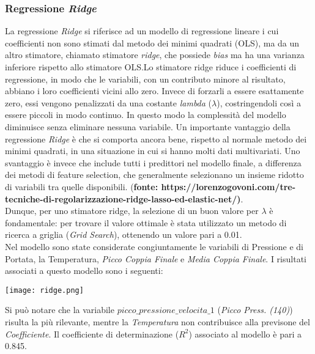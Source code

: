 \documentclass[fleqn,10pt]{SelfArx} %
\begin{document}
\subsubsection{Regressione \textit{Ridge}}
La regressione \textit{Ridge} si riferisce ad un modello di regressione lineare i cui coefficienti non sono stimati dal metodo dei minimi quadrati (OLS), ma da un altro stimatore, chiamato stimatore \textit{ridge}, che possiede \textit{bias} ma ha una varianza inferiore rispetto allo stimatore OLS.Lo stimatore ridge riduce i coefficienti di regressione, in modo che le variabili, con un contributo minore al risultato, abbiano i loro coefficienti vicini allo zero. Invece di forzarli a essere esattamente zero, essi vengono penalizzati da una costante \textit{lambda} ($\lambda$), costringendoli così a essere piccoli in modo continuo. In questo modo la complessità del modello diminuisce senza eliminare nessuna variabile. Un importante vantaggio della regressione \textit{Ridge} è che si comporta ancora bene, rispetto al normale metodo dei minimi quadrati, in una situazione in cui si hanno molti dati multivariati. Uno svantaggio è invece che include tutti i predittori nel modello finale, a differenza dei metodi di feature selection, che generalmente selezionano un insieme ridotto di variabili tra quelle disponibili. (\textbf{fonte: https://lorenzogovoni.com/tre-tecniche-di-regolarizzazione-ridge-lasso-ed-elastic-net/)}.\\
Dunque, per uno stimatore ridge, la selezione di un buon valore per $\lambda$ è fondamentale: per trovare il valore ottimale è stata utilizzato un metodo di ricerca a griglia (\textit{Grid Search}), ottenendo un valore pari a 0.01.\\
Nel modello sono state considerate congiuntamente le variabili di Pressione e di Portata, la Temperatura, \textit{Picco Coppia Finale} e \textit{Media Coppia Finale}. I risultati associati a questo modello sono i seguenti:
\begin{center}
\texttt{[image: ridge.png]}
\end{center}
Si può notare che la variabile $picco\_pressione\_velocita\_1$ (\textit{Picco Press. (140)}) risulta la più rilevante, mentre la \textit{Temperatura} non contribuisce alla previsone del \textit{Coefficiente}. Il coefficiente di determinazione ($R^2$) associato al modello è pari a 0.845.
\end{document}
